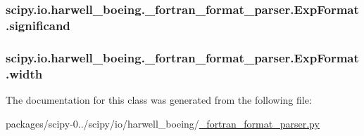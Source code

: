 \subsubsection[{significand}]{\setlength{\rightskip}{0pt plus 5cm}scipy.\+io.\+harwell\+\_\+boeing.\+\_\+fortran\+\_\+format\+\_\+parser.\+Exp\+Format.\+significand}\label{classscipy_1_1io_1_1harwell__boeing_1_1__fortran__format__parser_1_1ExpFormat_a02127e935158fbee2d5943ab0afad9d0}
\hypertarget{classscipy_1_1io_1_1harwell__boeing_1_1__fortran__format__parser_1_1ExpFormat_a19da087b9326fe3b3b287022d0bec3c3}{}
\subsubsection[{width}]{\setlength{\rightskip}{0pt plus 5cm}scipy.\+io.\+harwell\+\_\+boeing.\+\_\+fortran\+\_\+format\+\_\+parser.\+Exp\+Format.\+width}\label{classscipy_1_1io_1_1harwell__boeing_1_1__fortran__format__parser_1_1ExpFormat_a19da087b9326fe3b3b287022d0bec3c3}


The documentation for this class was generated from the following file\+:\begin{DoxyCompactItemize}
\item 
packages/scipy-\/0../scipy/io/harwell\+\_\+boeing/\hyperlink{__fortran__format__parser_8py}{\+\_\+fortran\+\_\+format\+\_\+parser.\+py}\end{DoxyCompactItemize}
